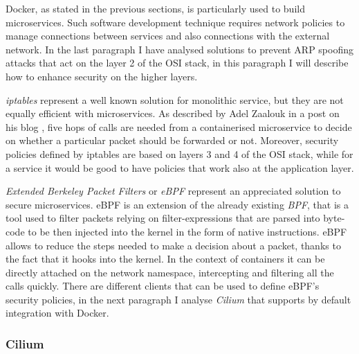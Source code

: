 \documentclass[a4paper,12pt]{article}
\begin{document}
Docker, as stated in the previous sections, is particularly used to build
microservices. Such software development technique requires network policies to
manage connections between services and also connections with the external
network. In the last paragraph I have analysed solutions to prevent ARP spoofing
attacks that act on the layer 2 of the OSI stack, in this paragraph I will
describe how to enhance security on the higher layers. \par \textit{iptables}
represent a well known solution for monolithic service, but they are not equally
efficient with microservices. As described by Adel Zaalouk in a post on his blog
\cite{zaalouk_networking}, five hops of calls are needed from a containerised
microservice to decide on whether a particular packet should be forwarded or
not. Moreover, security policies defined by iptables are based on layers 3 and 4
of the OSI stack, while for a service it would be good to have policies that
work also at the application layer. \par \textit{Extended Berkeley Packet
Filters} or \textit{eBPF} represent an appreciated solution to secure
microservices. eBPF is an extension of the already existing \textit{BPF}, that
is a tool used to filter packets relying on filter-expressions that are parsed
into byte-code to be then injected into the kernel in the form of native
instructions. eBPF allows to reduce the steps needed to make a decision about a
packet, thanks to the fact that it hooks into the kernel. In the context of
containers it can be directly attached on the network namespace, intercepting
and filtering all the calls quickly. There are different clients that can be
used to define eBPF's security policies, in the next paragraph I analyse
\textit{Cilium} that supports by default integration with Docker.

\subsubsection{Cilium}
\end{document}

